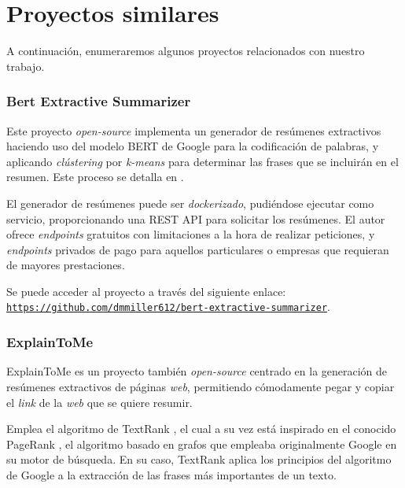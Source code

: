 
\section{Proyectos similares}

A continuación, enumeraremos algunos proyectos relacionados con nuestro trabajo.

\subsubsection{Bert Extractive Summarizer}

Este proyecto \emph{open-source} implementa un generador de resúmenes extractivos haciendo uso del modelo BERT \cite{devlin19} de Google para la codificación de palabras, y aplicando \emph{clústering} por \emph{k-means} para determinar las frases que se incluirán en el resumen. Este proceso se detalla en \cite{miller19}.

El generador de resúmenes puede ser \emph{dockerizado}, pudiéndose ejecutar como servicio, proporcionando una REST API para solicitar los resúmenes. El autor ofrece \emph{endpoints} gratuitos con limitaciones a la hora de realizar peticiones, y \emph{endpoints} privados de pago para aquellos particulares o empresas que requieran de mayores prestaciones.

Se puede acceder al proyecto a través del siguiente enlace: \\
\href{https://github.com/dmmiller612/bert-extractive-summarizer}{\texttt{{\small https://github.com/dmmiller612/bert-extractive-summarizer}}}.


\bigskip
\subsubsection{ExplainToMe}

ExplainToMe es un proyecto también \emph{open-source} centrado en la generación de resúmenes extractivos de páginas \emph{web}, permitiendo cómodamente pegar y copiar el \emph{link} de la \emph{web} que se quiere resumir.

Emplea el algoritmo de TextRank \cite{mihalce04}, el cual a su vez está inspirado en el conocido PageRank \cite{page99}, el algoritmo basado en grafos que empleaba originalmente Google en su motor de búsqueda. En su caso, TextRank aplica los principios del algoritmo de Google a la extracción de las frases más importantes de un texto.

